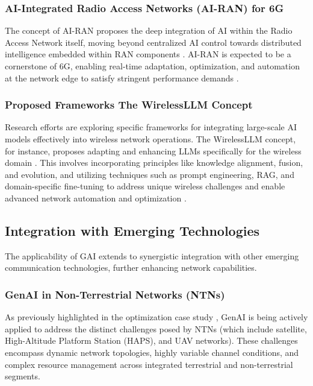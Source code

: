 \documentclass[sigconf]{acmart}
\begin{document}
\subsubsection{AI-Integrated Radio Access Networks (AI-RAN) for 6G}\label{subsubsec:6g_airan}
The concept of AI-RAN proposes the deep integration of AI within the Radio Access Network itself, moving beyond centralized AI control towards distributed intelligence embedded within RAN components \cite{ref34}. AI-RAN is expected to be a cornerstone of 6G, enabling real-time adaptation, optimization, and automation at the network edge to satisfy stringent performance demands \cite{ref34}.

\subsubsection{Proposed Frameworks The WirelessLLM Concept}
\label{subsubsec:6g_wirelessllm}
Research efforts are exploring specific frameworks for integrating large-scale AI models effectively into wireless network operations. The WirelessLLM concept, for instance, proposes adapting and enhancing LLMs specifically for the wireless domain \cite{ref17}. This involves incorporating principles like knowledge alignment, fusion, and evolution, and utilizing techniques such as prompt engineering, RAG, and domain-specific fine-tuning to address unique wireless challenges and enable advanced network automation and optimization \cite{ref17}.

\subsection{Integration with Emerging Technologies} \label{subsec:emerging_tech}

The applicability of GAI extends to synergistic integration with other emerging communication technologies, further enhancing network capabilities.

\subsubsection{GenAI in Non-Terrestrial Networks (NTNs)}\label{subsubsec:genai_ntn}
As previously highlighted in the optimization case study \cite{ref9}, GenAI is being actively applied to address the distinct challenges posed by NTNs (which include satellite, High-Altitude Platform Station (HAPS), and UAV networks). These challenges encompass dynamic network topologies, highly variable channel conditions, and complex resource management across integrated terrestrial and non-terrestrial segments.
\end{document}
